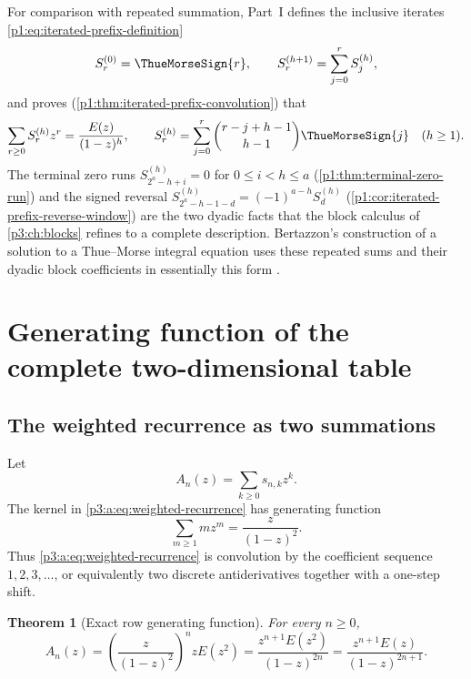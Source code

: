 \documentclass[11pt,oneside]{article}
\numberwithin{equation}{section}
\newtheorem{theorem}{Theorem}[section]
\theoremstyle{definition}
\theoremstyle{remark}
\begin{document}
For comparison with repeated summation, Part~I defines the inclusive
iterates \eqref{p1:eq:iterated-prefix-definition}
\begin{equation}
 S_r^{(0)}=\ThueMorseSign{r},
 \qquad
 S_r^{(h+1)}=\sum_{j=0}^{r}S_j^{(h)},
 \label{p3:eq:inclusive-prefix-definition}
\end{equation}
and proves (\cref{p1:thm:iterated-prefix-convolution}) that
\begin{equation}
 \sum_{r\ge0}S_r^{(h)}z^r
 =\frac{E(z)}{(1-z)^h},
 \qquad
 S_r^{(h)}
 =\sum_{j=0}^{r}
 \binom{r-j+h-1}{h-1}\ThueMorseSign{j}
 \quad(h\ge1).
 \label{p3:eq:inclusive-prefix-convolution}
\end{equation}
The terminal zero runs $S^{(h)}_{2^a-h+i}=0$ for $0\le i<h\le a$
(\cref{p1:thm:terminal-zero-run}) and the signed reversal
$S^{(h)}_{2^a-h-1-d}=(-1)^{a-h}S^{(h)}_d$
(\cref{p1:cor:iterated-prefix-reverse-window}) are the two dyadic facts that
the block calculus of \cref{p3:ch:blocks} refines to a complete description.
Bertazzon's construction of a solution to a Thue--Morse integral equation
uses these repeated sums and their dyadic block coefficients in essentially
this form \cite{p3:bertazzon}.

\section{Generating function of the complete two-dimensional table}\label{p3:ch:table}

\subsection{The weighted recurrence as two summations}

Let
\begin{equation}
 A_n(z)=\sum_{k\ge0}s_{n,k}z^k.
 \label{p3:a:eq:row-gf-definition}
\end{equation}
The kernel in \eqref{p3:a:eq:weighted-recurrence} has generating function
\begin{equation}
 \sum_{m\ge1}m z^m=\frac{z}{(1-z)^2}.
 \label{p3:a:eq:kernel-gf}
\end{equation}
Thus \eqref{p3:a:eq:weighted-recurrence} is convolution by the coefficient sequence
\(1,2,3,\ldots\), or equivalently two discrete antiderivatives together with
a one-step shift.

\begin{theorem}[Exact row generating function]
For every \(n\ge0\),
\begin{equation}
 \boxed{
 A_n(z)=
 \left(\frac{z}{(1-z)^2}\right)^n zE(z^2)
 =\frac{z^{n+1}E(z^2)}{(1-z)^{2n}}
 =\frac{z^{n+1}E(z)}{(1-z)^{2n+1}}.}
 \label{p3:a:eq:row-gf}
\end{equation}
\end{theorem}
\end{document}
